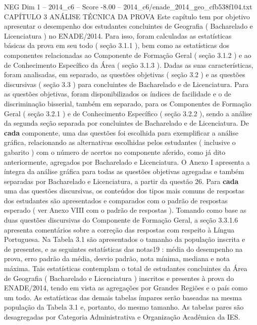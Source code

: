 \begin{textsample}{NEG Dim 1 – 2014\_c6 – Score -8.00 – 2014\_c6/enade\_2014\_geo\_cfb538f104.txt}  \label{ex:f1_neg_017}
CAPÍTULO 3 ANÁLISE TÉCNICA DA PROVA Este capítulo tem por objetivo apresentar o desempenho dos estudantes concluintes de Geografia ( Bacharelado e Licenciatura ) no ENADE/2014.
Para isso, foram calculadas as estatísticas básicas da prova em seu todo ( seção 3.1.1 ), bem como as estatísticas dos componentes relacionadas ao Componente de Formação Geral ( seção 3.1.2 ) e ao de Conhecimento Específico da Área ( seção 3.1.3 ).
Dadas as suas características, foram analisadas, em separado, as questões objetivas ( seção 3.2 ) e as questões discursivas ( seção 3.3 ) para concluintes de Bacharelado e de Licenciatura.
Para as questões objetivas, foram disponibilizados os índices de facilidade e o de discriminação bisserial, também em separado, para os Componentes de Formação Geral ( seção 3.2.1 ) e de Conhecimento Específico ( seção 3.2.2 ), sendo a análise da segunda seção separada por concluintes de Bacharelado e de Licenciatura.
De \textbf{cada} componente, uma das questões foi escolhida para exemplificar a análise gráfica, relacionando as alternativas escolhidas pelos estudantes ( inclusive o gabarito ) com o número de acertos no componente aferido, como já dito anteriormente, agregados por Bacharelado e Licenciatura.
O Anexo I apresenta a íntegra da análise gráfica para todas as questões objetivas agregadas e também separadas por Bacharelado e Licenciatura, a partir da questão 26.
Para \textbf{cada} uma das questões discursivas, os conteúdos dos tipos mais comuns de respostas dos estudantes são apresentados e comparados com o padrão de respostas esperado ( ver Anexo VIII com o padrão de respostas ).
Tomando como base as duas questões discursivas do Componente de Formação Geral, a seção 3.3.1.6 apresenta comentários sobre a correção das respostas com respeito à Língua Portuguesa.
Na Tabela 3.1 são apresentados o tamanho da população inscrita e de presentes, e as seguintes estatísticas das notas19 : média do desempenho na prova, erro padrão da média, desvio padrão, nota mínima, mediana e nota máxima.
Tais estatísticas contemplam o total de estudantes concluintes da Área de Geografia ( Bacharelado e Licenciatura ) inscritos e presentes à prova do ENADE/2014, tendo em vista as agregações por Grandes Regiões e o país como um todo.
As estatísticas das demais tabelas ímpares serão baseadas na mesma população da Tabela 3.1 e, portanto, do mesmo tamanho.
As tabelas pares são desagregadas por Categoria Administrativa e Organização Acadêmica da IES.

\end{textsample}
